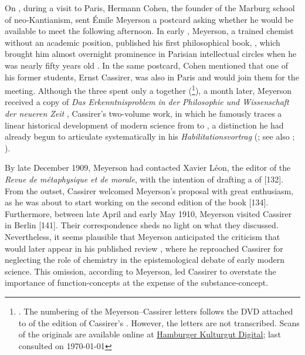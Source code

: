 \documentclass[submitted,12pt]{article}
\begin{document}
On , during a visit to Paris, Hermann Cohen, the founder of the Marburg school of neo-Kantianism, sent Émile Meyerson a postcard asking whether he would be available to meet the following afternoon. In early \citeyear{Meyerson1908}, Meyerson, a trained chemist without an academic position, published his first philosophical book, \IRt, which brought him almost overnight prominence in Parisian intellectual circles when he was nearly fifty years old \citep{Laclos2009a}. In the same postcard, Cohen mentioned that one of his former students, Ernst Cassirer, was also in Paris and would join them for the meeting. Although the three spent only a  together (\footnote{\cite[]{ECN}. The numbering of the Meyerson--Cassirer letters follows the DVD attached to \cite[]{ECN} of the edition of Cassirer's . However, the letters are not transcribed. Scans of the originals are available online at
\href{https://digitalisate.sub.uni-hamburg.de/recherche?tx_dlf_listview\%5Baction\%5D=main&tx_dlf_listview\%5Bcontroller\%5D=ListView&tx_dlf_listview\%5Bpage\%5D=1&tx_dlf_listview\%5Bsearch\%5D\%5Border\%5D=&tx_dlf_listview\%5Bsearch\%5D\%5BorderBy\%5D=&tx_dlf_listview\%5Bsearch\%5D\%5Bquery\%5D=Meyerson&cHash=0d009ea45cd8a5124ca05a24b99420c9}{Hamburger Kulturgut Digital}; last consulted on \today}), a month later, Meyerson received a copy of \emph{Das Erkenntnisproblem in der Philosophie und Wissenschaft der neueren Zeit} \citep{Cassirer1906a,Cassirer1907b}, Cassirer’s two-volume work, in which he famously traces a linear historical development of modern science from \SCs to \FCs, a distinction he had already begun to articulate systematically in his \emph{Habilitationsvortrag} (\cite{Cassirer1907}; see also \cite{Cassirer1907a}; \cite{Cassirer1909a}).

By late December 1909, Meyerson had contacted Xavier Léon, the editor of the \emph{Revue de métaphysique et de morale}, with the intention of drafting a  of \EPt {}[132]. From the outset, Cassirer welcomed Meyerson’s proposal with great enthusiasm, as he was about to start working on the second edition of the book [134]. Furthermore, between late April and early May 1910, Meyerson visited Cassirer in Berlin [141]. Their correspondence sheds no light on what they discussed. Nevertheless, it seems plausible that Meyerson anticipated the criticism that would later appear in his published review \citep{Meyerson1911}, where he reproached Cassirer for neglecting the role of chemistry in the epistemological debate of early modern science. This omission, according to Meyerson, led Cassirer to overstate the importance of function-concepts at the expense of the substance-concept.
\end{document}
